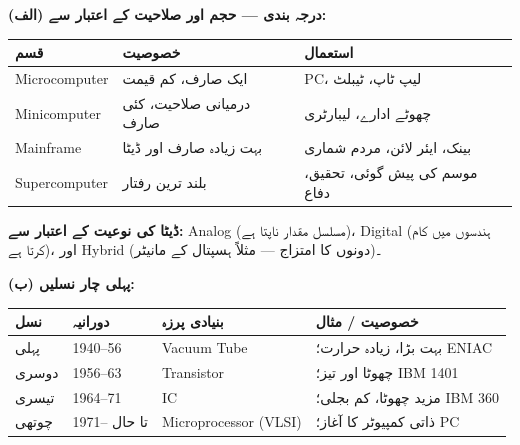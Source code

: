 \begin{hal}
\textbf{(الف) درجہ بندی --- حجم اور صلاحیت کے اعتبار سے:}
\begin{center}
\begin{tabular}{@{}p{3.2cm} p{6.2cm} p{4.8cm}@{}}
\toprule
\textbf{قسم} & \textbf{خصوصیت} & \textbf{استعمال} \\
\midrule
\textenglish{Microcomputer} & ایک صارف، کم قیمت & \textenglish{PC}، لیپ ٹاپ، ٹیبلٹ \\
\textenglish{Minicomputer}  & درمیانی صلاحیت، کئی صارف & چھوٹے ادارے، لیبارٹری \\
\textenglish{Mainframe}     & بہت زیادہ صارف اور ڈیٹا & بینک، ایئر لائن، مردم شماری \\
\textenglish{Supercomputer} & بلند ترین رفتار & موسم کی پیش گوئی، تحقیق، دفاع \\
\bottomrule
\end{tabular}
\end{center}

\textbf{ڈیٹا کی نوعیت کے اعتبار سے:} \textenglish{Analog} (مسلسل مقدار ناپتا
ہے)، \textenglish{Digital} (ہندسوں میں کام کرتا ہے)، اور
\textenglish{Hybrid} (دونوں کا امتزاج --- مثلاً ہسپتال کے مانیٹر)۔

\medskip
\textbf{(ب) پہلی چار نسلیں:}
\begin{center}
\begin{tabular}{@{}p{1.6cm} p{2.6cm} p{4.4cm} p{5.0cm}@{}}
\toprule
\textbf{نسل} & \textbf{دورانیہ} & \textbf{بنیادی پرزہ} & \textbf{خصوصیت / مثال} \\
\midrule
پہلی   & \textenglish{1940--56} & \textenglish{Vacuum Tube}   & بہت بڑا، زیادہ حرارت؛ \textenglish{ENIAC} \\
دوسری  & \textenglish{1956--63} & \textenglish{Transistor}    & چھوٹا اور تیز؛ \textenglish{IBM 1401} \\
تیسری  & \textenglish{1964--71} & \textenglish{IC}            & مزید چھوٹا، کم بجلی؛ \textenglish{IBM 360} \\
چوتھی  & \textenglish{1971--} تا حال & \textenglish{Microprocessor (VLSI)} & ذاتی کمپیوٹر کا آغاز؛ \textenglish{PC} \\
\bottomrule
\end{tabular}
\end{center}

\end{hal}

